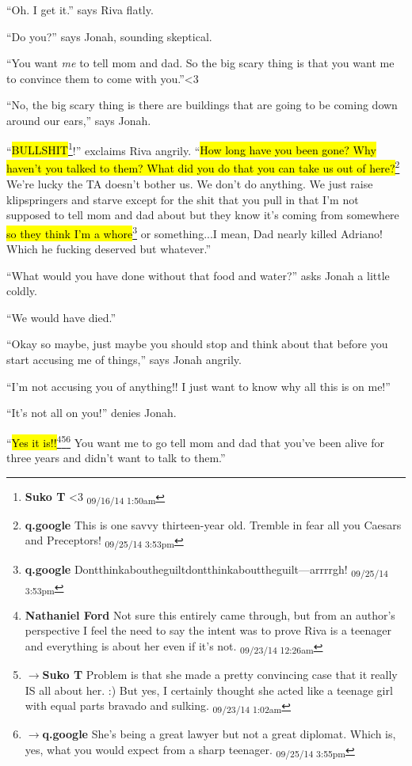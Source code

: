 ``Oh.  I get it.'' says Riva flatly.

``Do you?'' says Jonah, sounding skeptical.

``You want \textit{me} to tell mom and dad.  So the big scary thing is that you want me to convince them to come with you.''\textless 3

``No, the big scary thing is there are buildings that are going to be coming down around our ears,'' says Jonah.

``\hl{BULLSHIT}\footnote{\textbf{Suko T }\textless 3 \textsubscript{09/16/14 1:50am}}!'' exclaims Riva angrily.  ``\hl{How long have you been gone?  Why haven't you talked to them?  What did you do that you can take us out of here?}\footnote{\textbf{q.google }This is one savvy thirteen-year old.  Tremble in fear all you Caesars and Preceptors! \textsubscript{09/25/14 3:53pm}}  We're lucky the TA doesn't bother us.  We don't do anything.   We just raise klipspringers and starve except for the shit that you pull in that I'm not supposed to tell mom and dad about but they know it's coming from somewhere \hl{so they think I'm a whore}\footnote{\textbf{q.google }Dontthinkaboutheguiltdontthinkabouttheguilt---arrrrgh! \textsubscript{09/25/14 3:53pm}} or something...I mean, Dad nearly killed Adriano!  Which he fucking deserved but whatever.''

``What would you have done without that food and water?'' asks Jonah a little coldly.

``We would have died.''

``Okay so maybe, just maybe you should stop and think about that before you start accusing me of things,'' says Jonah angrily.

``I'm not accusing you of anything!!  I just want to know why all this is on me!''

``It's not all on you!'' denies Jonah.

``\hl{Yes it is!!}\footnote{\textbf{Nathaniel Ford }Not sure this entirely came through, but from an author's perspective I feel the need to say the intent was to prove Riva is a teenager and everything is about her even if it's not. \textsubscript{09/23/14 12:26am}}\footnote{$\rightarrow$\textbf{Suko T }Problem is that she made a pretty convincing case that it really IS all about her. :)  But yes, I certainly thought she acted like a teenage girl with equal parts bravado and sulking. \textsubscript{09/23/14 1:02am}}\footnote{$\rightarrow$\textbf{q.google }She's being a great lawyer but not a great diplomat.  Which is, yes, what you would expect from a sharp teenager. \textsubscript{09/25/14 3:55pm}} You want me to go tell mom and dad that you've been alive for three years and didn't want to talk to them.''

